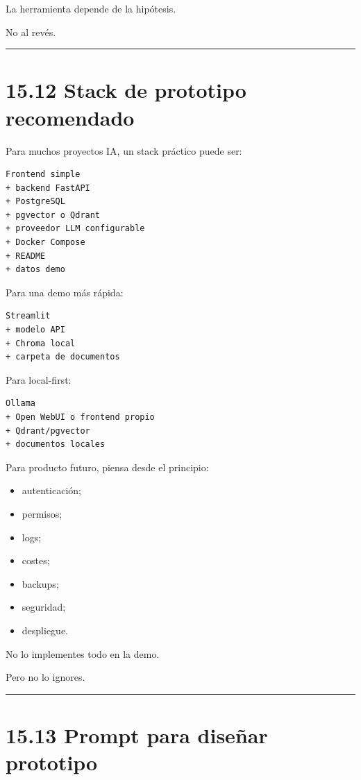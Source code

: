 La herramienta depende de la hipótesis.

No al revés.

\begin{center}\rule{0.5\linewidth}{0.5pt}\end{center}

\section{15.12 Stack de prototipo
recomendado}\label{stack-de-prototipo-recomendado}

Para muchos proyectos IA, un stack práctico puede ser:

\begin{lstlisting}
Frontend simple
+ backend FastAPI
+ PostgreSQL
+ pgvector o Qdrant
+ proveedor LLM configurable
+ Docker Compose
+ README
+ datos demo
\end{lstlisting}

Para una demo más rápida:

\begin{lstlisting}
Streamlit
+ modelo API
+ Chroma local
+ carpeta de documentos
\end{lstlisting}

Para local-first:

\begin{lstlisting}
Ollama
+ Open WebUI o frontend propio
+ Qdrant/pgvector
+ documentos locales
\end{lstlisting}

Para producto futuro, piensa desde el principio:

\begin{itemize}
\tightlist
\item
  autenticación;
\item
  permisos;
\item
  logs;
\item
  costes;
\item
  backups;
\item
  seguridad;
\item
  despliegue.
\end{itemize}

No lo implementes todo en la demo.

Pero no lo ignores.

\begin{center}\rule{0.5\linewidth}{0.5pt}\end{center}

\section{15.13 Prompt para diseñar
prototipo}\label{prompt-para-diseuxf1ar-prototipo}

